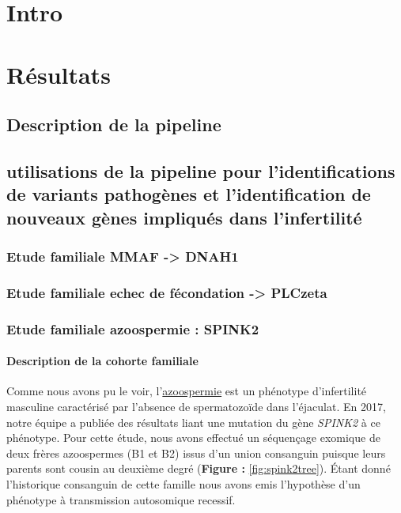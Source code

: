 \documentclass[12pt,twoside]{reedthesis}
\theoremstyle{definition}
\theoremstyle{definition}
\theoremstyle{remark}
\begin{document}
  \section{Intro}\label{intro}
  
  \section{Résultats}\label{resultats}
  
  \subsection{Description de la
  pipeline}\label{description-de-la-pipeline}
  
  \subsection{utilisations de la pipeline pour l'identifications de
  variants pathogènes et l'identification de nouveaux gènes impliqués dans
  l'infertilité}\label{utilisations-de-la-pipeline-pour-lidentifications-de-variants-pathogenes-et-lidentification-de-nouveaux-genes-impliques-dans-linfertilite}
  
  \subsubsection{Etude familiale MMAF -\textgreater{}
  DNAH1}\label{etude-familiale-mmaf---dnah1}
  
  \subsubsection{Etude familiale echec de fécondation -\textgreater{}
  PLCzeta}\label{etude-familiale-echec-de-fecondation---plczeta}
  
  \subsubsection{Etude familiale azoospermie :
  SPINK2}\label{etude-familiale-azoospermie-spink2}
  
  \paragraph{Description de la cohorte
  familiale}\label{description-de-la-cohorte-familiale}
  
  Comme nous avons pu le voir, l'\protect\hyperlink{infquant}{azoospermie}
  est un phénotype d'infertilité masculine caractérisé par l'absence de
  spermatozoïde dans l'éjaculat. En 2017, notre équipe a publiée des
  résultats liant une mutation du gène \emph{SPINK2} à ce phénotype. Pour
  cette étude, nous avons effectué un séquençage exomique de deux frères
  azoospermes (B1 et B2) issus d'un union consanguin puisque leurs parents
  sont cousin au deuxième degré (\textbf{Figure : }\ref{fig:spink2tree}).
  Étant donné l'historique consanguin de cette famille nous avons emis
  l'hypothèse d'un phénotype à transmission autosomique recessif.
  
\end{document}
